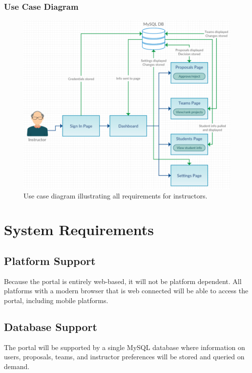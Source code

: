 \documentclass[12pt]{article}
\begin{document}
\subsubsection{Use Case Diagram}
\begin{figure}[!htb]
	\includegraphics[width=\linewidth]{instructor.png}
	\caption{Use case diagram illustrating all requirements for instructors.}
	\label{fig:instructor}
\end{figure}

\section{System Requirements}

\subsection{Platform Support}

Because the portal is entirely web-based, it will not be platform dependent. All platforms with a modern browser that is web connected will be able to access the portal, including mobile platforms.

\subsection{Database Support}

The portal will be supported by a single MySQL database where information on users, proposals, teams, and instructor preferences will be stored and queried on demand.
\end{document}
